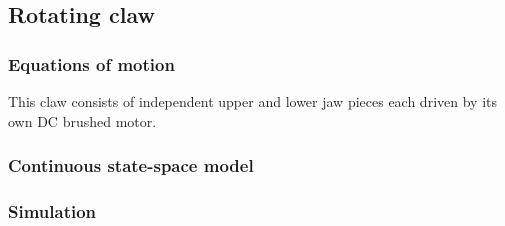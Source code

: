 \subsection{Rotating claw}

\subsubsection{Equations of motion}

This claw consists of independent upper and lower jaw pieces each driven by its
own DC brushed motor.

\subsubsection{Continuous state-space model}

\subsubsection{Simulation}
